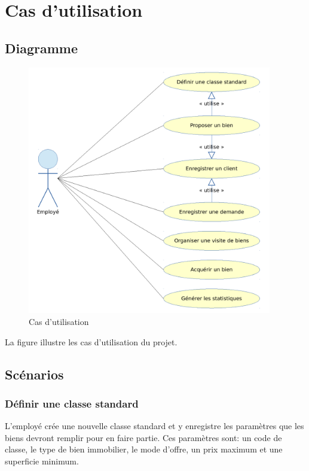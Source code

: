 \chapter{Cas d'utilisation}

\section{Diagramme}

\begin{figure}
  \centering
  \includegraphics[width=0.95\textwidth]{IMG/uc}
  \caption{Cas d'utilisation}
  \label{img_uc}
\end{figure}

La figure  illustre les cas d'utilisation du projet.

\section{Scénarios}

\subsection{Définir une classe standard}

L'employé crée une nouvelle classe standard et y enregistre les paramètres que les biens devront remplir pour en faire partie. Ces paramètres sont: un code de classe, le type de bien immobilier, le mode d'offre, un prix maximum et une superficie minimum.

